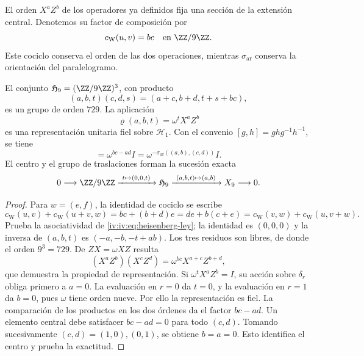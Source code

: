 El orden \(X^aZ^b\) de los operadores ya definidos fija una sección
de la extensión central. Denotemos su factor de composición por
\begin{equation}
 c_{\mathrm W}(u,v)=bc\quad\text{en }\ZZ/9\ZZ.
 \label{iv:iv:eq:weyl-cociclo-polarizado}
\end{equation}
Este cociclo conserva el orden de las dos operaciones, mientras
\(\sigma_{\mathrm{ar}}\) conserva la orientación del paralelogramo.

\begin{proposition}
\label{iv:iv:prop:heisenberg-orientado}
El conjunto \(\mathfrak H_9=(\ZZ/9\ZZ)^3\), con producto
\begin{equation}
 (a,b,t)(c,d,s)=(a+c,b+d,t+s+bc),
 \label{iv:iv:eq:heisenberg-ley}
\end{equation}
es un grupo de orden \(729\). La aplicación
\[
 \varrho(a,b,t)=\omega^tX^aZ^b
\]
es una representación unitaria fiel sobre \(\mathcal H_1\).
Con el convenio \([g,h]=ghg^{-1}h^{-1}\), se tiene
\begin{equation}
 [\varrho(a,b,0),\varrho(c,d,0)]
 =\omega^{bc-ad}I
 =\omega^{-\sigma_{\mathrm{ar}}((a,b),(c,d))}I.
 \label{iv:iv:eq:weyl-conmutador-orientado}
\end{equation}
El centro y el grupo de traslaciones forman la sucesión exacta
\[
 0\longrightarrow\ZZ/9\ZZ
 \xrightarrow{\ t\mapsto(0,0,t)\ }\mathfrak H_9
 \xrightarrow{\ (a,b,t)\mapsto(a,b)\ }X_9
 \longrightarrow0.
\]
\end{proposition}
\begin{proof}
Para \(w=(e,f)\), la identidad de cociclo se escribe
\[
 c_{\mathrm W}(u,v)+c_{\mathrm W}(u+v,w)
 =bc+(b+d)e
 =de+b(c+e)
 =c_{\mathrm W}(v,w)+c_{\mathrm W}(u,v+w).
\]
Prueba la asociatividad de \eqref{iv:iv:eq:heisenberg-ley}; la identidad
es \((0,0,0)\) y la inversa de \((a,b,t)\) es
\((-a,-b,-t+ab)\). Los tres residuos son libres, de donde el orden
\(9^3=729\). De \(ZX=\omega XZ\) resulta
\[
 (X^aZ^b)(X^cZ^d)=\omega^{bc}X^{a+c}Z^{b+d},
\]
que demuestra la propiedad de representación. Si
\(\omega^tX^aZ^b=I\), su acción sobre \(\delta_r\) obliga primero
a \(a=0\). La evaluación en \(r=0\) da \(t=0\), y la
evaluación en \(r=1\) da \(b=0\), pues \(\omega\) tiene orden
nueve. Por ello la representación es fiel. La comparación de los
productos en los dos órdenes da el factor \(bc-ad\).
Un elemento central debe satisfacer \(bc-ad=0\) para todo \((c,d)\).
Tomando sucesivamente \((c,d)=(1,0),(0,1)\), se obtiene
\(b=a=0\). Esto identifica el centro y prueba la exactitud.
\end{proof}

